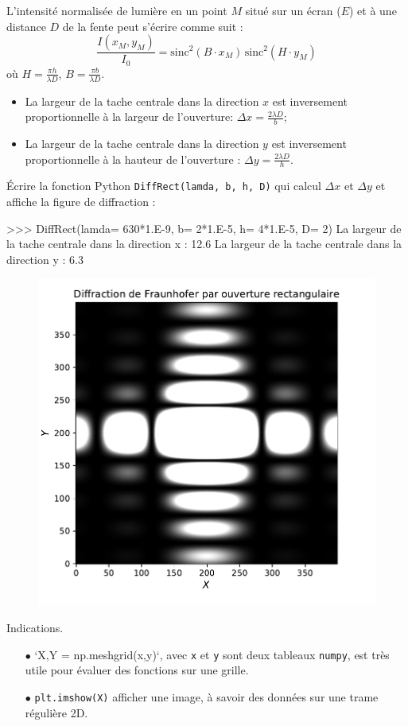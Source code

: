 \documentclass[a4paper,11pt]{article}
\theoremstyle{mytheor}
\begin{document}
L'intensité normalisée de lumière en un point $M$ situé sur un écran ($E$) et à une distance $D$ de la fente peut s'écrire comme suit :
\begin{equation}
\dfrac{I(x_{M}, y_{M})}{I_{0}} = \text{sinc}^{2}\left (B \cdot x_{M} \right)\,\text{sinc}^{2}  \left ( H \cdot y_{M} \right )
\label{Eq_1_3}
\end{equation}
%
où $H = \frac{\pi h}{\lambda D}$, $B = \frac{\pi b}{\lambda D}$.

\begin{itemize}
\item La largeur de la tache centrale dans la direction $x$ est inversement proportionnelle à la largeur de l'ouverture: $\Delta x = \frac{2 \lambda D}{b}$;
\item La largeur de la tache centrale dans la direction $y$ est inversement proportionnelle à la hauteur de l'ouverture : $\Delta y = \frac{2 \lambda D}{h}$.
\end{itemize}

Écrire la fonction Python \verb|DiffRect(lamda, b, h, D)| qui calcul $\Delta x$ et $\Delta y$ et affiche la figure de diffraction :
\begin{pyshell}
>>> DiffRect(lamda= 630*1.E-9, b= 2*1.E-5, h= 4*1.E-5, D= 2)
La largeur de la tache centrale dans la direction x :  12.6
La largeur de la tache centrale dans la direction y :  6.3
\end{pyshell}
\begin{figure}[th!]
\centering
\includegraphics[width=0.55\linewidth]{figures/figureDiff}
\end{figure}
\begin{bclogo}[logo=\bclampe, couleurBarre=green, noborder=true, couleur=yellow!10]{Indications.}
\begin{itemize}
\item[$\bullet$] `X,Y = np.meshgrid(x,y)`, avec \verb|x| et \verb|y| sont deux tableaux \verb|numpy|, est très utile pour évaluer des fonctions sur une grille.
\item[$\bullet$] \verb|plt.imshow(X)| afficher une image, à savoir des données sur une trame régulière 2D.
\end{itemize}
\end{bclogo}
\end{document}
